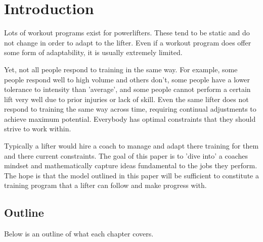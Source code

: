 \chapter{Introduction}
\label{sec:Introduction}

Lots of workout programs exist for powerlifters. These tend to be static and do not change in order to adapt to the lifter. Even if a workout program does offer some form of adaptability, it is usually extremely limited.

Yet, not all people respond to training in the same way. For example, some people respond well to high volume and others don't, some people have a lower tolerance to intensity than 'average', and some people cannot perform a certain lift very well due to prior injuries or lack of skill. Even the same lifter does not respond to training the same way across time, requiring continual adjustments to achieve maximum potential. Everybody has optimal constraints that they should strive to work within.

Typically a lifter would hire a coach to manage and adapt there training for them and there current constraints. The goal of this paper is to 'dive into' a coaches mindset and mathematically capture ideas fundamental to the jobs they perform. The hope is that the model outlined in this paper will be sufficient to constitute a training program that a lifter can follow and make progress with.

\section{Outline}
\label{sec:Outline}

Below is an outline of what each chapter covers.

